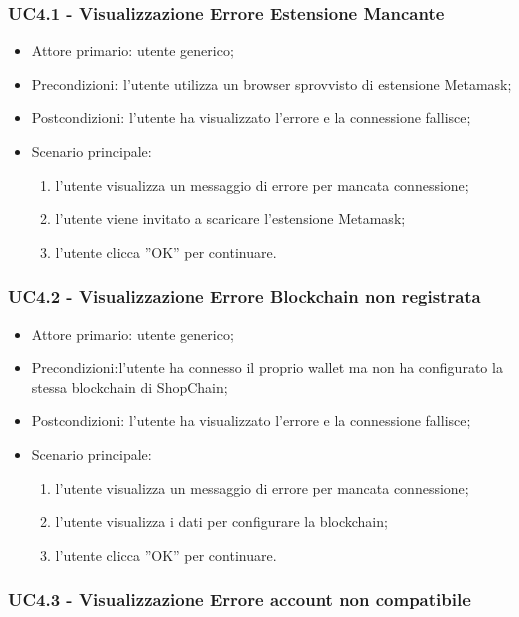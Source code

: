 \subsubsection{UC4.1 - Visualizzazione Errore Estensione Mancante}

\begin{itemize}
    \item Attore primario: utente generico;
    \item Precondizioni: l'utente utilizza un browser sprovvisto di estensione Metamask;
    \item Postcondizioni: l'utente ha visualizzato l'errore e la connessione fallisce;
    \item Scenario principale: 
    \begin{enumerate}
        \item l'utente visualizza un messaggio di errore per mancata connessione;
        \item l'utente viene invitato a scaricare l'estensione Metamask;
        \item l'utente clicca ”OK” per continuare.
    \end{enumerate}
\end{itemize}

\subsubsection{UC4.2 - Visualizzazione Errore Blockchain non registrata}

\begin{itemize}
    \item Attore primario: utente generico;
    \item Precondizioni:l'utente ha connesso il proprio wallet ma non ha configurato la stessa blockchain di ShopChain;
    \item Postcondizioni: l'utente ha visualizzato l'errore e la connessione fallisce;
    \item Scenario principale:
    \begin{enumerate}
        \item l'utente visualizza un messaggio di errore per mancata connessione;
        \item l'utente visualizza i dati per configurare la blockchain;
        \item l'utente clicca ”OK” per continuare.
    \end{enumerate}
\end{itemize}

\subsubsection{UC4.3 - Visualizzazione Errore account non compatibile}

